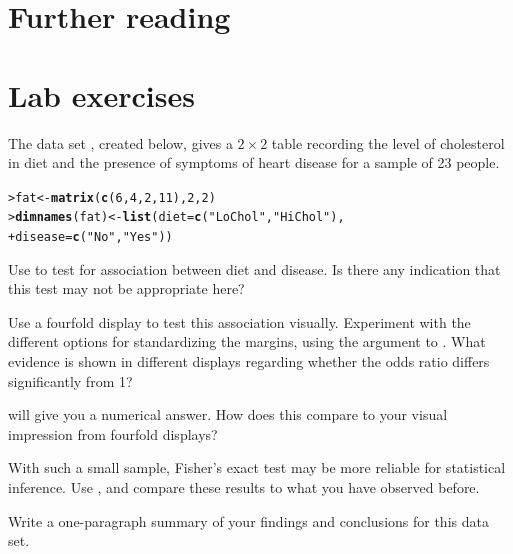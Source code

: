 \documentclass[10pt,krantz2]{krantz}\usepackage[]{graphicx}\usepackage[]{color}
\makeatletter
\newcommand{\hlnum}[1]{\textcolor[rgb]{0.686,0.059,0.569}{#1}}%
\newcommand{\hlstr}[1]{\textcolor[rgb]{0.192,0.494,0.8}{#1}}%
\newcommand{\hlstd}[1]{\textcolor[rgb]{0.345,0.345,0.345}{#1}}%
\newcommand{\hlkwb}[1]{\textcolor[rgb]{0.69,0.353,0.396}{#1}}%
\newcommand{\hlkwc}[1]{\textcolor[rgb]{0.333,0.667,0.333}{#1}}%
\newcommand{\hlkwd}[1]{\textcolor[rgb]{0.737,0.353,0.396}{\textbf{#1}}}%
\newenvironment{kframe}{%
 \def\at@end@of@kframe{}%
 \ifinner\ifhmode%
  \def\at@end@of@kframe{\end{minipage}}%
  \begin{minipage}{\columnwidth}%
 \fi\fi%
 \def\FrameCommand##1{\hskip\@totalleftmargin \hskip-\fboxsep
 \colorbox{shadecolor}{##1}\hskip-\fboxsep
     \hskip-\linewidth \hskip-\@totalleftmargin \hskip\columnwidth}%
 \MakeFramed {\advance\hsize-\width
   \@totalleftmargin\z@ \linewidth\hsize
   \@setminipage}}%
 {\par\unskip\endMakeFramed%
 \at@end@of@kframe}
\newenvironment{knitrout}{}{} %
\renewenvironment{knitrout}{\small\renewcommand{\baselinestretch}{.85}}{} %
\makeatother
\begin{document}
\section{Further reading}\label{sec:twoway-reading}

\section{Lab exercises}\label{sec:twoway-lab}


\begin{Exercises}

  \exercise The data set , created below, gives a $2 \times 2$ table recording the level of
  cholesterol in diet and the presence of symptoms of heart disease for a sample of
  23 people.

\begin{knitrout}
\color{fgcolor}\begin{kframe}
\begin{alltt}
\hlstd{> }\hlstd{fat} \hlkwb{<-} \hlkwd{matrix}\hlstd{(} \hlkwd{c}\hlstd{(}\hlnum{6}\hlstd{,} \hlnum{4}\hlstd{,} \hlnum{2}\hlstd{,} \hlnum{11}\hlstd{),} \hlnum{2}\hlstd{,} \hlnum{2}\hlstd{)}
\hlstd{> }\hlkwd{dimnames}\hlstd{(fat)} \hlkwb{<-} \hlkwd{list}\hlstd{(}\hlkwc{diet}\hlstd{=}\hlkwd{c}\hlstd{(}\hlstr{"LoChol"}\hlstd{,} \hlstr{"HiChol"}\hlstd{),}
\hlstd{+ }                      \hlkwc{disease}\hlstd{=}\hlkwd{c}\hlstd{(}\hlstr{"No"}\hlstd{,} \hlstr{"Yes"}\hlstd{))}
\end{alltt}
\end{kframe}
\end{knitrout}

  \begin{enumerate*}
    \item Use  to test for association between diet and disease.
    Is there any indication that this test may not be appropriate here?
    \item Use a fourfold display to test this association visually.  Experiment with
    the different options for standardizing the margins, using the 
    argument to . What evidence is shown in different displays regarding
    whether the odds ratio differs significantly from 1?
    \item {} will give you a numerical answer.  How does
    this compare to your visual impression from fourfold displays?
    \item With such a small sample, Fisher's exact test may be more reliable for statistical
    inference.  Use , and compare these results to what you have
    observed before.
    \item Write a one-paragraph summary of your findings and conclusions for this data set.
  \end{enumerate*}


\end{Exercises}
\end{document}
